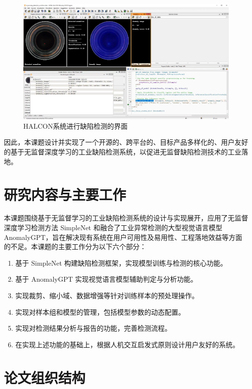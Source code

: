 \documentclass[
  ]{njuthesis}
\begin{document}
\begin{figure}[ht]
  \centering
  \includegraphics[width=\textwidth]{images/HALCON系统界面.png}
  \caption{HALCON系统进行缺陷检测的界面}
  \label{HALCON}
\end{figure}

因此，本课题设计并实现了一个开源的、跨平台的、目标产品多样化的、用户友好的基于无监督深度学习的工业缺陷检测系统，以促进无监督缺陷检测技术的工业落地。

\section{研究内容与主要工作}

本课题围绕基于无监督学习的工业缺陷检测系统的设计与实现展开，应用了无监督深度学习检测方法 SimpleNet 和融合了工业异常检测的大型视觉语言模型 AnomalyGPT，旨在解决现有系统在用户可用性及易用性、工程落地效益等方面的不足。本课题的主要工作分为以下六个部分：  

\begin{enumerate}
    \item 基于 SimpleNet 构建缺陷检测框架，实现模型训练与检测的核心功能。
    \item 基于 AnomalyGPT 实现视觉语言模型辅助判定与分析功能。
    \item 实现裁剪、缩小域、数据增强等针对训练样本的预处理操作。
    \item 实现对样本组和模型的管理，包括模型参数的动态配置。
    \item 实现对检测结果分析与报告的功能，完善检测流程。
    \item 在实现上述功能的基础上，根据人机交互启发式原则设计用户友好的系统。
\end{enumerate}

\section{论文组织结构}
\end{document}
